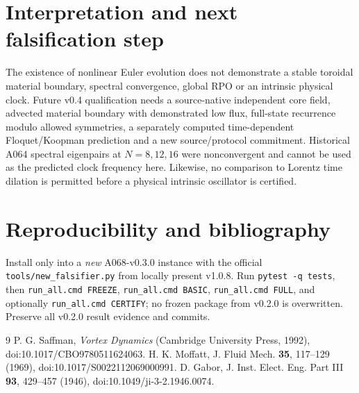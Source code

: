 \documentclass[11pt,a4paper]{article}
\begin{document}
\section{Interpretation and next falsification step}
The existence of nonlinear Euler evolution does not demonstrate a stable toroidal material boundary, spectral convergence, global RPO or an intrinsic physical clock. Future v0.4 qualification needs a source-native independent core field, advected material boundary with demonstrated low flux, full-state recurrence modulo allowed symmetries, a separately computed time-dependent Floquet/Koopman prediction and a new source/protocol commitment. Historical A064 spectral eigenpairs at $N=8,12,16$ were nonconvergent and cannot be used as the predicted clock frequency here. Likewise, no comparison to Lorentz time dilation is permitted before a physical intrinsic oscillator is certified.

\section{Reproducibility and bibliography}
Install only into a \emph{new} A068-v0.3.0 instance with the official \texttt{tools/new\_falsifier.py} from locally present v1.0.8. Run \texttt{pytest -q tests}, then \texttt{run\_all.cmd FREEZE}, \texttt{run\_all.cmd BASIC}, \texttt{run\_all.cmd FULL}, and optionally \texttt{run\_all.cmd CERTIFY}; no frozen package from v0.2.0 is overwritten. Preserve all v0.2.0 result evidence and commits.\par
\begin{thebibliography}{9}
 P. G. Saffman, \emph{Vortex Dynamics} (Cambridge University Press, 1992), doi:10.1017/CBO9780511624063.
 H. K. Moffatt, J. Fluid Mech. \textbf{35}, 117--129 (1969), doi:10.1017/S0022112069000991.
 D. Gabor, J. Inst. Elect. Eng. Part III \textbf{93}, 429--457 (1946), doi:10.1049/ji-3-2.1946.0074.
\end{thebibliography}
\end{document}
